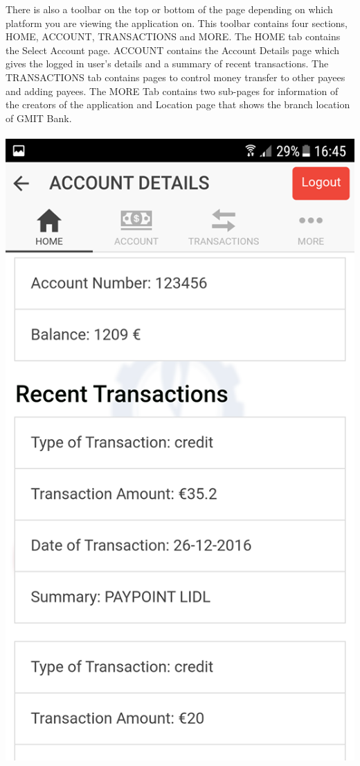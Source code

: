  There is also a toolbar on the top or bottom of the page depending on which platform you are viewing the application on. This toolbar contains four sections, HOME, ACCOUNT, TRANSACTIONS and MORE. The HOME tab contains the Select Account page. ACCOUNT contains the Account Details page which gives the logged in user’s details and a summary of recent transactions. The TRANSACTIONS tab contains pages to control money transfer to other payees and adding payees. The MORE Tab contains two sub-pages for information of the creators of the application and Location page that shows the branch location of GMIT Bank.
\paragraph{} 
 
\begin{center}    
    \includegraphics[scale=0.5]{img/8homepagetransactions.png}
\end{center}
